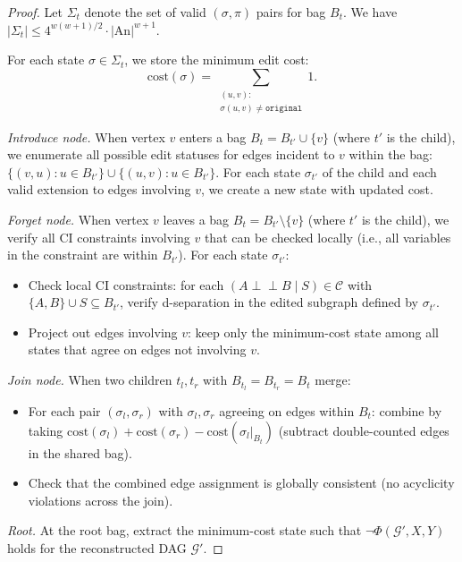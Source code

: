\documentclass[11pt,a4paper]{article}
\theoremstyle{definition}
\theoremstyle{remark}
\newcommand{\CI}{\perp\!\!\!\perp}
\newcommand{\DAG}{\mathcal{G}}
\newcommand{\An}{\mathrm{An}}
\newcommand{\Phi}{\varPhi}
\begin{document}
\begin{proof}
Let $\Sigma_t$ denote the set
of valid $(\sigma, \pi)$ pairs for bag $B_t$. We have $|\Sigma_t| \leq 4^{w(w+1)/2}
\cdot |\An|^{w+1}$.

For each state $\sigma \in \Sigma_t$, we store the minimum edit cost:
\[
  \mathrm{cost}(\sigma) = \sum_{\substack{(u,v):\\ \sigma(u,v) \neq \texttt{original}}} 1.
\]

\textit{Introduce node.} When vertex $v$ enters a bag $B_t = B_{t'} \cup \{v\}$
(where $t'$ is the child), we enumerate all possible edit statuses for edges incident
to $v$ within the bag: $\{(v, u) : u \in B_{t'}\} \cup \{(u, v) : u \in B_{t'}\}$.
For each state $\sigma_{t'}$ of the child and each valid extension to edges involving
$v$, we create a new state with updated cost.

\textit{Forget node.} When vertex $v$ leaves a bag $B_t = B_{t'} \setminus \{v\}$
(where $t'$ is the child), we verify all CI constraints involving $v$ that can be
checked locally (i.e., all variables in the constraint are within $B_{t'}$). For each
state $\sigma_{t'}$:
\begin{itemize}
  \item Check local CI constraints: for each $(A \CI B \mid S) \in \mathcal{C}$ with
    $\{A, B\} \cup S \subseteq B_{t'}$, verify d-separation in the edited subgraph
    defined by $\sigma_{t'}$.
  \item Project out edges involving $v$: keep only the minimum-cost state among all
    states that agree on edges not involving $v$.
\end{itemize}

\textit{Join node.} When two children $t_l, t_r$ with $B_{t_l} = B_{t_r} = B_t$ merge:
\begin{itemize}
  \item For each pair $(\sigma_l, \sigma_r)$ with $\sigma_l, \sigma_r$ agreeing on edges
    within $B_t$: combine by taking $\mathrm{cost}(\sigma_l) + \mathrm{cost}(\sigma_r) -
    \mathrm{cost}(\sigma_l|_{B_t})$ (subtract double-counted edges in the shared bag).
  \item Check that the combined edge assignment is globally consistent (no acyclicity
    violations across the join).
\end{itemize}

\textit{Root.} At the root bag, extract the minimum-cost state such that $\neg\Phi(\DAG', X, Y)$
holds for the reconstructed DAG $\DAG'$.


\end{proof}
\end{document}
